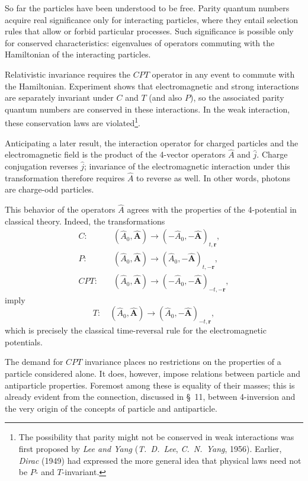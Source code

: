 So far the particles have been understood to be free. Parity quantum numbers acquire real significance only for interacting particles, where they entail selection rules that allow or forbid particular processes. Such significance is possible only for conserved characteristics: eigenvalues of operators commuting with the Hamiltonian of the interacting particles.

Relativistic invariance requires the $CPT$ operator in any event to commute with the Hamiltonian. Experiment shows that electromagnetic and strong interactions are separately invariant under $C$ and $T$ (and also $P$), so the associated parity quantum numbers are conserved in these interactions. In the weak interaction, these conservation laws are violated\footnote{The possibility that parity might not be conserved in weak interactions was first proposed by \emph{Lee and Yang} (\emph{T.~D.~Lee}, \emph{C.~N.~Yang}, 1956). Earlier, \emph{Dirac} (1949) had expressed the more general idea that physical laws need not be $P$- and $T$-invariant.}.

Anticipating a later result, the interaction operator for charged particles and the electromagnetic field is the product of the 4-vector operators $\widehat A$ and $\widehat j$. Charge conjugation reverses $\widehat j$; invariance of the electromagnetic interaction under this transformation therefore requires $\widehat A$ to reverse as well. In other words, photons are charge-odd particles.

This behavior of the operators $\widehat A$ agrees with the properties of the 4-potential in classical theory. Indeed, the transformations
\[
\begin{aligned}
C:\quad &(\widehat A_0,\widehat{\mathbf A})\to(-\widehat A_0,-\widehat{\mathbf A})_{t,\mathbf r},\\
P:\quad &(\widehat A_0,\widehat{\mathbf A})\to(\widehat A_0,-\widehat{\mathbf A})_{t,-\mathbf r},\\
CPT:\quad &(\widehat A_0,\widehat{\mathbf A})\to(-\widehat A_0,-\widehat{\mathbf A})_{-t,-\mathbf r},
\end{aligned}
\]
imply
\[
T:\quad (\widehat A_0,\widehat{\mathbf A})\to(\widehat A_0,-\widehat{\mathbf A})_{-t,\mathbf r},
\]
which is precisely the classical time-reversal rule for the electromagnetic potentials.

The demand for $CPT$ invariance places no restrictions on the properties of a particle considered alone. It does, however, impose relations between particle and antiparticle properties. Foremost among these is equality of their masses; this is already evident from the connection, discussed in \S~11, between 4-inversion and the very origin of the concepts of particle and antiparticle.


